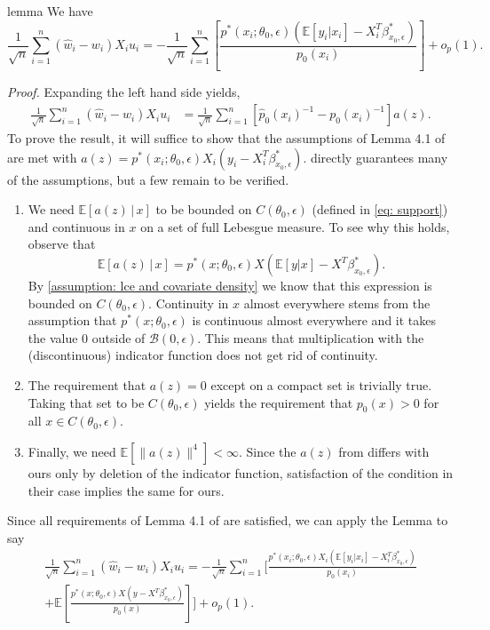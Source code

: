 \documentclass[11pt]{article}
\begin{document}
\begin{restatable}{lemma}{} \label{lemma: newey lemma}
    We have
    \[\frac{1}{\sqrt{n}}\sum_{i = 1}^n(\hat{w}_i - w_i)X_iu_i = -\frac{1}{\sqrt{n}}\sum_{i = 1}^n\left[\frac{p^*(x_i;\theta_0, \epsilon)(\mathbb{E}[y_i|x_i] - X_i^T\beta^*_{x_0, \epsilon})}{p_0(x_i)}\right] + o_p(1).\]
\end{restatable}
\noindent \textit{Proof.} Expanding the left hand side yields,
\begin{align*}
    \frac{1}{\sqrt{n}}\sum_{i = 1}^n(\hat{w}_i - w_i)X_iu_i &= \frac{1}{\sqrt{n}}\sum_{i = 1}^n\left[\hat{p}_0(x_i)^{-1} - p_0(x_i)^{-1}\right]a(z).
\end{align*}
To prove the result, it will suffice to show that the assumptions of Lemma 4.1 of \citet{Newey_Ruud_2005} are met with $a(z) = p^*(x_i;\theta_0, \epsilon) X_i\left(y_i - X_i^T\beta^*_{x_0, \epsilon}\right)$.  directly guarantees many of the assumptions, but a few remain to be verified. 
\begin{enumerate}
    \item We need $\mathbb{E}[a(z)\,|\,x]$ to be bounded on $C(\theta_0, \epsilon)$ (defined in \cref{eq: support}) and continuous in $x$ on a set of full Lebesgue measure. To see why this holds, observe that 
    \[\mathbb{E}[a(z)\,|\,x] = p^*(x;\theta_0, \epsilon) X\left(\mathbb{E}[y | x] - X^T\beta^*_{x_0, \epsilon}\right).\]
    By \cref{assumption: lce and covariate density} we know that this expression is bounded on $C(\theta_0, \epsilon)$. Continuity in $x$ almost everywhere stems from the assumption that $p^*(x; \theta_0, \epsilon)$ is continuous almost everywhere and it takes the value $0$ outside of $\mathcal{B}(0, \epsilon)$. This means that multiplication with the (discontinuous) indicator function does not get rid of continuity. 
    \item The requirement that $a(z) = 0$ except on a compact set is trivially true. Taking that set to be $C(\theta_0, \epsilon)$ yields the requirement that $p_0(x) > 0$ for all $x \in C(\theta_0, \epsilon).$ 
    \item Finally, we need $\mathbb{E}\left[\|a(z)\|^4\right] < \infty$. Since the $a(z)$ from \citet{Newey_Ruud_2005} differs with ours only by deletion of the indicator function, satisfaction of the condition in their case implies the same for ours. 
\end{enumerate}
Since all requirements of Lemma 4.1 of \citet{Newey_Ruud_2005} are satisfied, we can apply the Lemma to say
\begin{multline}
    \frac{1}{\sqrt{n}}\sum_{i = 1}^n(\hat{w}_i - w_i)X_iu_i = -\frac{1}{\sqrt{n}}\sum_{i = 1}^n\Bigg[\frac{p^*(x_i;\theta_0, \epsilon) X_i\left(\mathbb{E}[y_i|x_i] - X_i^T\beta^*_{x_0, \epsilon}\right)}{p_0(x_i)} \\
    + \mathbb{E}\left[\frac{p^*(x;\theta_0, \epsilon) X\left(y - X^T\beta^*_{x_0, \epsilon}\right)}{p_0(x)}\right]\Bigg] + o_p(1).
\end{multline}
\end{document}
